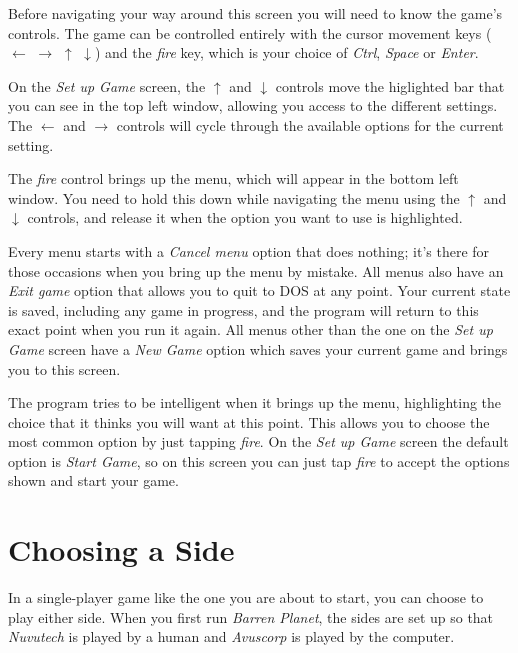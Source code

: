 Before navigating your way around this screen you will need to know the game's controls. The game can be controlled entirely with the cursor movement keys ($\leftarrow$ $\rightarrow$ $\uparrow$ $\downarrow$) and the {\it fire} key, which is your choice of {\it Ctrl}, {\it Space} or {\it Enter}.

On the {\it Set up Game} screen, the $\uparrow$ and $\downarrow$ controls move the higlighted bar that you can see in the top left window, allowing you access to the different settings. The $\leftarrow$ and $\rightarrow$ controls will cycle through the available options for the current setting.

The {\it fire} control brings up the menu, which will appear in the bottom left window. You need to hold this down while navigating the menu using the $\uparrow$ and $\downarrow$ controls, and release it when the option you want to use is highlighted.

Every menu starts with a {\it Cancel menu} option that does nothing; it's there for those occasions when you bring up the menu by mistake. All menus also have an {\it Exit game} option that allows you to quit to DOS at any point. Your current state is saved, including any game in progress, and the program will return to this exact point when you run it again. All menus other than the one on the {\it Set up Game} screen have a {\it New Game} option which saves your current game and brings you to this screen.

The program tries to be intelligent when it brings up the menu, highlighting the choice that it thinks you will want at this point. This allows you to choose the most common option by just tapping {\it fire}. On the {\it Set up Game} screen the default option is {\it Start Game}, so on this screen you can just tap {\it fire} to accept the options shown and start your game.

\section{Choosing a Side}

\noindent
In a single-player game like the one you are about to start, you can choose to play either side. When you first run {\it Barren Planet}, the sides are set up so that {\it Nuvutech} is played by a human and {\it Avuscorp} is played by the computer.

